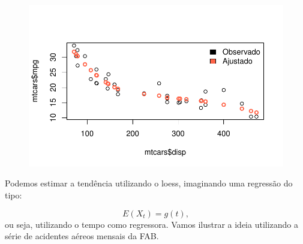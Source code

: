 \documentclass[
  letterpaper,
  DIV=11,
  numbers=noendperiod]{scrreprt}
\begin{document}
\begin{figure}[H]

{\centering \includegraphics{ferramentas_files/figure-pdf/unnamed-chunk-1-1.pdf}

}

\end{figure}

Podemos estimar a tendência utilizando o loess, imaginando uma regressão
do tipo:

\[E(X_t)=g(t),\] ou seja, utilizando o tempo como regressora. Vamos
ilustrar a ideia utilizando a série de acidentes aéreos mensais da FAB.
\end{document}
